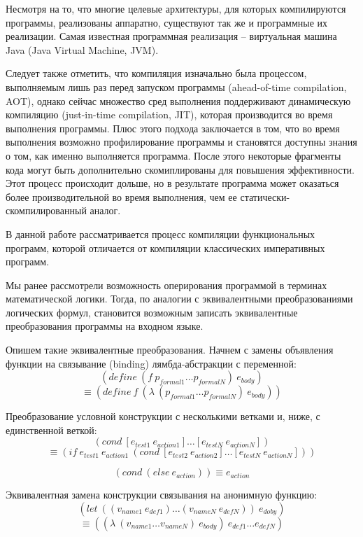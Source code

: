 \documentclass[a4paper,14pt]{extreport} %
\begin{document}
Несмотря на то, что многие целевые архитектуры, для которых компилируются программы, реализованы аппаратно, существуют так же и программные их реализации. Самая известная программная реализация -- виртуальная машина Java (Java Virtual Machine, JVM).

Следует также отметить, что компиляция изначально была процессом, выполняемым лишь раз перед запуском программы (ahead-of-time compilation, AOT), однако сейчас множество сред выполнения поддерживают динамическую компиляцию (just-in-time compilation, JIT), которая производится во время выполнения программы. Плюс этого подхода заключается в том, что во время выполнения возможно профилирование программы и становятся доступны знания о том, как именно выполняется программа. После этого некоторые фрагменты кода могут быть дополнительно скомиплированы для повышения эффективности. Этот процесс происходит дольше, но в результате программа может оказаться более производительной во время выполнения, чем ее статически-скомпилированный аналог.

В данной работе рассматривается процесс компиляции функциональных программ, которой отличается от компиляции классических императивных программ.

Мы ранее рассмотрели возможность оперирования программой в терминах математической логики. Тогда, по аналогии с эквивалентными преобразованиями логических формул, становится возможным записать эквивалентные преобразования программы на входном языке.

Опишем такие эквивалентные преобразования. Начнем с замены объявления функции на связывание (binding) лямбда-абстракции с переменной:
$$(define \ (f \ p_{formal1} \dots p_{formalN}) \ e_{body})$$
$$\equiv (define \ f \ (\lambda \ (p_{formal1} \dots p_{formalN}) \ e_{body}))$$

Преобразование условной конструкции с несколькими ветками и, ниже, с единственной веткой:
$$
(cond \ [e_{test1} \ e_{action1}] \dots [e_{testN} \ e_{actionN}])$$
$$\equiv (if \ e_{test1} \ e_{action1} \ (cond \ [e_{test2} \ e_{action2}] \dots [e_{testN} \ e_{actionN}]))$$

$$(cond \ (else \ e_{action})) \equiv e_{action}$$

Эквивалентная замена конструкции связывания на анонимную функцию:
$$(let \ ((v_{name1} \ e_{def1}) \dots(v_{nameN} \ e_{defN})) \ e_{doby})$$
$$\equiv ((\lambda \ (v_{name1} \dots v_{nameN}) \ e_{body})  \ e_{def1} \dots e_{defN})$$




\end{document}
